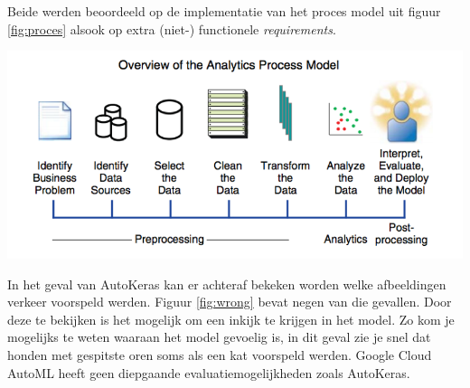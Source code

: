 \documentclass[a0,portrait]{a0poster}
\begin{document}
\begin{multicols}{2}
Beide werden beoordeeld op de implementatie van het proces model uit figuur \ref{fig:proces} alsook op extra (niet-) functionele \textit{requirements}.

\begin{center}\vspace{1cm}
    \includegraphics[width=1.0\linewidth]{../bachproef/img/proces-model.png}
    \label{fig:proces}
\end{center}\vspace{1cm}

In het geval van AutoKeras kan er achteraf bekeken worden welke afbeeldingen verkeer voorspeld werden. Figuur \ref{fig:wrong} bevat negen van die gevallen. Door deze te bekijken is het mogelijk om een inkijk te krijgen in het model. Zo kom je mogelijks te weten waaraan het model gevoelig is, in dit geval zie je snel dat honden met gespitste oren soms als een kat voorspeld werden. Google Cloud AutoML heeft geen diepgaande evaluatiemogelijkheden zoals AutoKeras.


\end{multicols}
\end{document}
